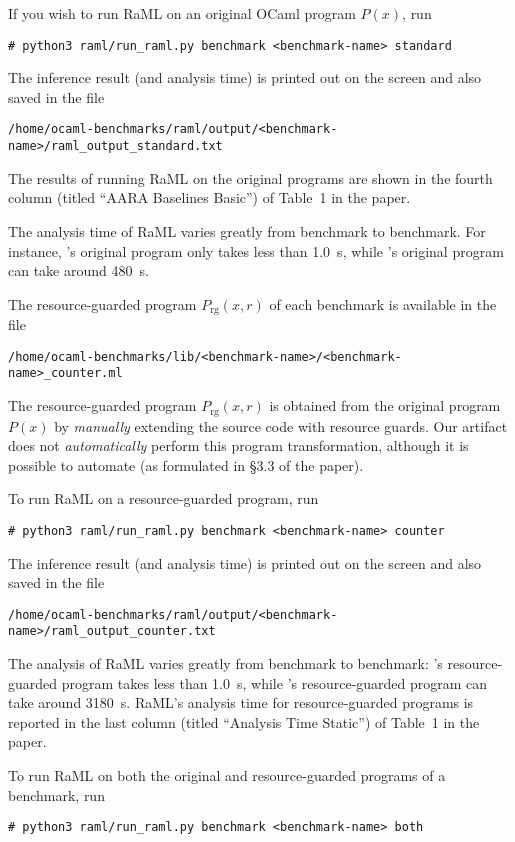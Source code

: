 If you wish to run RaML on an original OCaml program $P(x)$, run
\begin{verbatim}
# python3 raml/run_raml.py benchmark <benchmark-name> standard
\end{verbatim}
%
The inference result (and analysis time) is printed out on the screen and also
saved in the file
\begin{verbatim}
/home/ocaml-benchmarks/raml/output/<benchmark-name>/raml_output_standard.txt
\end{verbatim}
%
The results of running RaML on the original programs are shown in the fourth
column (titled ``AARA Baselines Basic'') of Table~1 in the paper.

The analysis time of RaML varies greatly from benchmark to benchmark.
%
For instance, \mergesort{}'s original program only takes less than
\qty{1.0}{\second}, while \redblacktree{}'s original program can take around
\qty{480}{\second}.

The resource-guarded program $P_{\mathrm{rg}}(x, r)$ of each benchmark is
available in the file
\begin{verbatim}
/home/ocaml-benchmarks/lib/<benchmark-name>/<benchmark-name>_counter.ml
\end{verbatim}
%
The resource-guarded program $P_{\mathrm{rg}}(x, r)$ is obtained from the
original program $P(x)$ by \emph{manually} extending the source code with
resource guards.
%
Our artifact does not \emph{automatically} perform this program transformation,
although it is possible to automate (as formulated in \S3.3 of the paper).

To run RaML on a resource-guarded program, run
\begin{verbatim}
# python3 raml/run_raml.py benchmark <benchmark-name> counter
\end{verbatim}
%
The inference result (and analysis time) is printed out on the screen and also
saved in the file
\begin{verbatim}
/home/ocaml-benchmarks/raml/output/<benchmark-name>/raml_output_counter.txt
\end{verbatim}
%
The analysis of RaML varies greatly from benchmark to benchmark: \mergesort{}'s
resource-guarded program takes less than \qty{1.0}{\second}, while \dijkstra{}'s
resource-guarded program can take around \qty{3180}{\second}.
%
RaML's analysis time for resource-guarded programs is reported in the last
column (titled ``Analysis Time Static'') of Table~1 in the paper.

To run RaML on both the original and resource-guarded programs of a benchmark,
run
\begin{verbatim}
# python3 raml/run_raml.py benchmark <benchmark-name> both
\end{verbatim}

